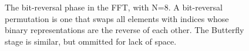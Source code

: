 \begin{figure}[t]
\begin{center}
%
\vspace{-6pt}
\caption{The bit-reversal phase in the FFT, with N=8.  A bit-reversal permutation is one that swaps all elements with indices whose binary representations are the reverse of each other.  The Butterfly stage is similar, but ommitted for lack of space.
\protect\label{fig:bitreverseorder}}
\vspace{-18pt}
\end{center}
\end{figure}




